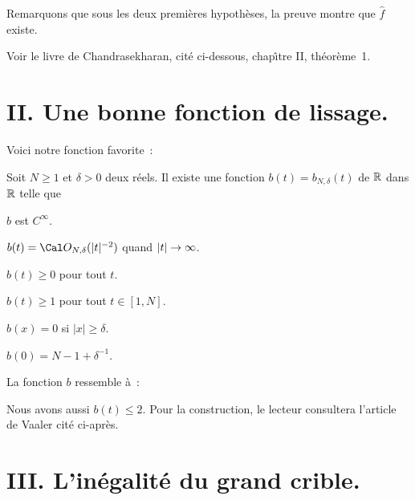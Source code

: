 Remarquons que sous les deux premi\`eres hypoth\`eses, la preuve
montre que $\hat f$ existe.

Voir le livre de Chandrasekharan, cit\'e ci-dessous,
chap\^\i tre II, th\'eor\`eme~1.
\fin

\section{II. Une bonne fonction de lissage.}

Voici notre fonction favorite~:

Soit $N\ge1$ et $\delta>0$ deux r\'eels. Il existe une fonction
$b(t)=b_{N,\delta}(t)$ de $\Bbb R$ dans $\Bbb R$ telle que
\roster
\item $b$ est $C^\infty$.
\item $b(t)=\Cal O_{N,\delta}(|t|^{-2})$ quand $|t|\goes\infty$.
\item $b(t)\ge0$ pour tout $t$.
\item $b(t)\ge1$ pour tout $t\in[1,N]$.
\item $\hat b(x)=0$ si $|x|\ge\delta$.
\item $\hat b(0)=N-1+\delta^{-1}$.
\endroster
\endproclaim

La fonction $b$ ressemble \`a~:

\vskip1cm

Nous avons aussi $b(t)\le 2$. Pour la construction, le lecteur
consultera l'article de Vaaler cit\'e ci-apr\`es.


\section{III. L'in\'egalit\'e du grand crible.}


